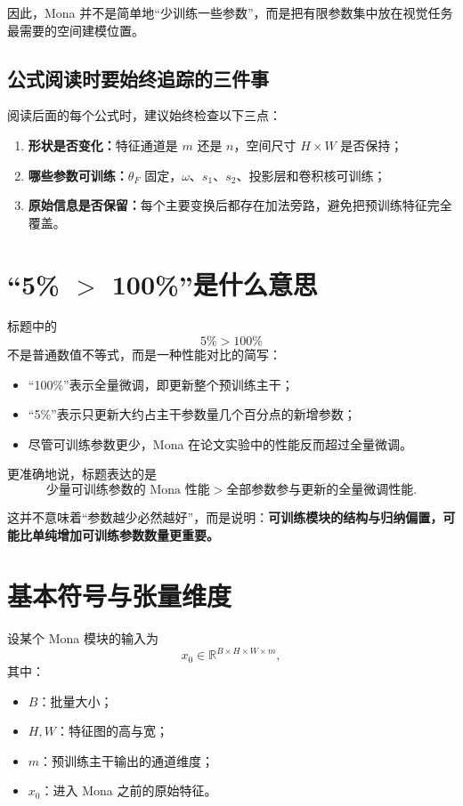 \documentclass[UTF8,12pt,a4paper,fontset=none]{ctexart}
\newcommand{\R}{\mathbb{R}}
\begin{document}
因此，Mona 并不是简单地“少训练一些参数”，而是把有限参数集中放在视觉任务最需要的空间建模位置。

\subsection{公式阅读时要始终追踪的三件事}

阅读后面的每个公式时，建议始终检查以下三点：
\begin{enumerate}
  \item \textbf{形状是否变化：}特征通道是 $m$ 还是 $n$，空间尺寸 $H\times W$ 是否保持；
  \item \textbf{哪些参数可训练：}$\theta_F$ 固定，$\omega$、$s_1$、$s_2$、投影层和卷积核可训练；
  \item \textbf{原始信息是否保留：}每个主要变换后都存在加法旁路，避免把预训练特征完全覆盖。
\end{enumerate}

\section{“5\% \texorpdfstring{$>$}{>} 100\%”是什么意思}

标题中的
\begin{equation}
5\%>100\%
\end{equation}
不是普通数值不等式，而是一种性能对比的简写：
\begin{itemize}
  \item “100\%”表示全量微调，即更新整个预训练主干；
  \item “5\%”表示只更新大约占主干参数量几个百分点的新增参数；
  \item 尽管可训练参数更少，Mona 在论文实验中的性能反而超过全量微调。
\end{itemize}

更准确地说，标题表达的是
\begin{equation}
\text{少量可训练参数的 Mona 性能}
>
\text{全部参数参与更新的全量微调性能}.
\end{equation}

这并不意味着“参数越少必然越好”，而是说明：\textbf{可训练模块的结构与归纳偏置，可能比单纯增加可训练参数数量更重要。}

\section{基本符号与张量维度}

设某个 Mona 模块的输入为
\begin{equation}
 x_0\in\R^{B\times H\times W\times m},
\end{equation}
其中：
\begin{itemize}
  \item $B$：批量大小；
  \item $H,W$：特征图的高与宽；
  \item $m$：预训练主干输出的通道维度；
  \item $x_0$：进入 Mona 之前的原始特征。
\end{itemize}
\end{document}
